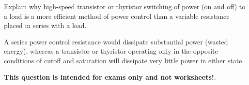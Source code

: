

Explain why high-speed transistor or thyristor switching of power (on and off) to a load is a more efficient method of power control than a variable resistance placed in series with a load.







A series power control resistance would dissipate substantial power (wasted energy), whereas a transistor or thyristor operating only in the opposite conditions of cutoff and saturation will dissipate very little power in either state.







{\bf This question is intended for exams only and not worksheets!}.




